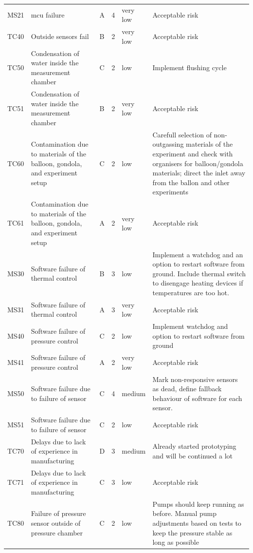 \begin{longtable}{L{1.5cm}L{3cm}L{1cm}L{1cm}L{2cm}L{6cm}}
 MS21 & \gls{mcu} failure & A & 4 & very low & Acceptable risk\\
 TC40 & Outside sensors fail & B & 2 & very low & Acceptable risk \\
 TC50 & Condensation of water inside the measurement chamber & C & 2 & low & Implement flushing cycle \\
 TC51 & Condensation of water inside the measurement chamber & B & 2 & very low & Acceptable risk \\
 TC60 & Contamination due to materials of the balloon, gondola, and experiment setup & C & 2 & low & Carefull selection of non-outgassing materials of the experiment and check with organisers for balloon/gondola materials; direct the inlet away from the ballon and other experiments\\
 TC61 & Contamination due to materials of the balloon, gondola, and experiment setup & A & 2 & very low & Acceptable risk\\
 MS30 & Software failure of thermal control & B & 3 & low & Implement a watchdog and an option to restart software from ground. Include thermal switch to disengage heating devices if temperatures are too hot. \\
 MS31 & Software failure of thermal control & A & 3 & very low & Acceptable risk \\
 MS40 & Software failure of pressure control & C & 2 & low & Implement watchdog and option to restart software from ground \\
 MS41 & Software failure of pressure control & A & 2 & very low & Acceptable risk \\
 MS50 & Software failure due to failure of sensor & C & 4 & medium & Mark non-responsive sensors as dead, define fallback behaviour of software for each sensor. \\
 MS51 & Software failure due to failure of sensor & C & 2 & low & Acceptable risk \\
 TC70 & Delays due to lack of experience in manufacturing
 & D & 3 & medium & Already started prototyping and will be continued a lot \\
 TC71 & Delays due to lack of experience in manufacturing & C & 3 & low & Acceptable risk \\
 TC80 & Failure of pressure sensor outside of pressure chamber & C & 2 & low & Pumps should keep running as before. Manual pump adjustments based on tests to keep the pressure stable as long as possible \\

\end{longtable}
